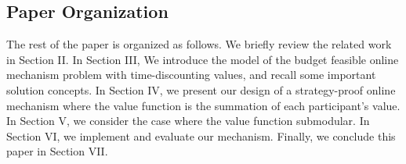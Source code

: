 \documentclass[10pt,journal,letterpaper,compsoc]{IEEEtran}
\newcommand{\ie}{{\em i.e.}}
\begin{document}
\subsection{Paper Organization}
The rest of the paper is organized as follows. We briefly review the related work in Section II. In Section III, We introduce the model of the budget feasible online mechanism problem with time-discounting values, and recall some important solution concepts. In Section IV, we present our design of a strategy-proof online  mechanism where the value function is the summation of each participant's value. In Section V, we consider the case where the value function submodular. In Section VI, we implement and evaluate our mechanism. Finally, we conclude this paper in Section VII.
\end{document}
